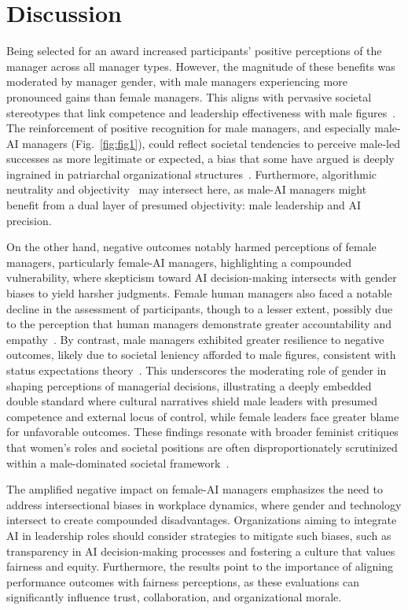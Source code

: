 \documentclass{article}
\begin{document}
\section*{Discussion}

Being selected for an award increased participants' positive perceptions of the manager across all manager types. However, the magnitude of these benefits was moderated by manager gender, with male managers experiencing more pronounced gains than female managers.
This aligns with pervasive societal stereotypes that link competence and leadership effectiveness with male figures~\cite{eagly1984gender, ridgeway2001gender, eagly2002role}. 
The reinforcement of positive recognition for male managers, and especially male-AI managers (Fig.~\ref{fig:fig1}), could reflect societal tendencies to perceive male-led successes as more legitimate or expected, a bias that some have argued is deeply ingrained in patriarchal organizational structures~\cite{connell2020social}. Furthermore, algorithmic neutrality and objectivity~\cite{green2020algorithmic} may intersect here, as male-AI managers might benefit from a dual layer of presumed objectivity: male leadership and AI precision.

On the other hand, negative outcomes notably harmed perceptions of female managers, particularly female-AI managers, highlighting a compounded vulnerability, where skepticism toward AI decision-making intersects with gender biases to yield harsher judgments. Female human managers also faced a notable decline in the assessment of participants, though to a lesser extent, possibly due to the perception that human managers demonstrate greater accountability and empathy~\cite{montemayor2022principle}.
By contrast, male managers exhibited greater resilience to negative outcomes, likely due to societal leniency afforded to male figures, consistent with status expectations theory~\cite{ridgeway2001gender}. 
This underscores the moderating role of gender in shaping perceptions of managerial decisions, illustrating a deeply embedded double standard where cultural narratives shield male leaders with presumed competence and external locus of control, while female leaders face greater blame for unfavorable outcomes. 
These findings resonate with broader feminist critiques that women’s roles and societal positions are often disproportionately scrutinized within a male-dominated societal framework~\cite{butler1990feminism, hooks2000feminist}.

The amplified negative impact on female-AI managers emphasizes the need to address intersectional biases in workplace dynamics, where gender and technology intersect to create compounded disadvantages. Organizations aiming to integrate AI in leadership roles should consider strategies to mitigate such biases, such as transparency in AI decision-making processes and fostering a culture that values fairness and equity. Furthermore, the results point to the importance of aligning performance outcomes with fairness perceptions, as these evaluations can significantly influence trust, collaboration, and organizational morale.
\end{document}
